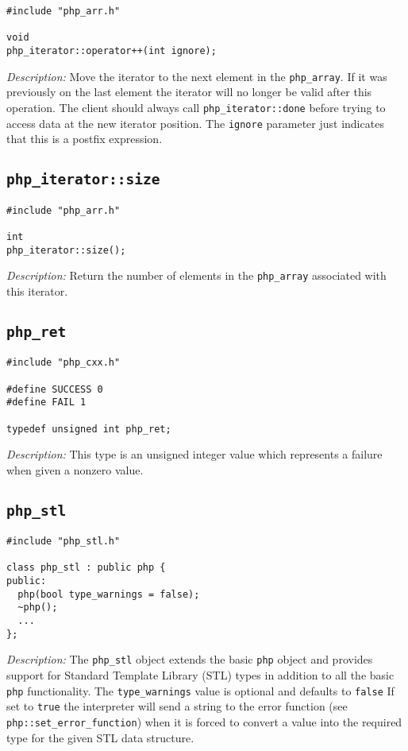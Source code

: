 \documentclass[11pt,titlepage]{article}
\begin{document}
\begin{verbatim}
#include "php_arr.h"

void 
php_iterator::operator++(int ignore);
\end{verbatim}

\emph{Description:} Move the iterator to the next element in the \verb|php_array|. If it was previously on the last element the iterator will no longer be valid after this operation. The client should always call \verb|php_iterator::done| before trying to access data at the new iterator position. The \verb|ignore| parameter just indicates that this is a postfix expression.


\subsection{\texttt{php\_iterator::size}}

\begin{verbatim}
#include "php_arr.h"

int 
php_iterator::size();
\end{verbatim}

\emph{Description:} Return the number of elements in the \verb|php_array| associated with this iterator. 


\subsection{\texttt{php\_ret}}

\begin{verbatim}
#include "php_cxx.h"

#define SUCCESS 0
#define FAIL 1

typedef unsigned int php_ret;
\end{verbatim}

\emph{Description:} This type is an unsigned integer value which represents a failure when given a nonzero value.


\subsection{\texttt{php\_stl}}

\begin{verbatim}
#include "php_stl.h"

class php_stl : public php {
public:
  php(bool type_warnings = false);
  ~php();
  ...
};
\end{verbatim}

\emph{Description:} The \verb|php_stl| object extends the basic \verb|php| object and provides support for Standard Template Library (STL) types in addition to all the basic \verb|php| functionality. The \verb|type_warnings| value is optional and defaults to \verb|false| If set to \verb|true| the interpreter will send a string to the error function (see \verb|php::set_error_function|) when it is forced to convert a value into the required type for the given STL data structure.
\end{document}
